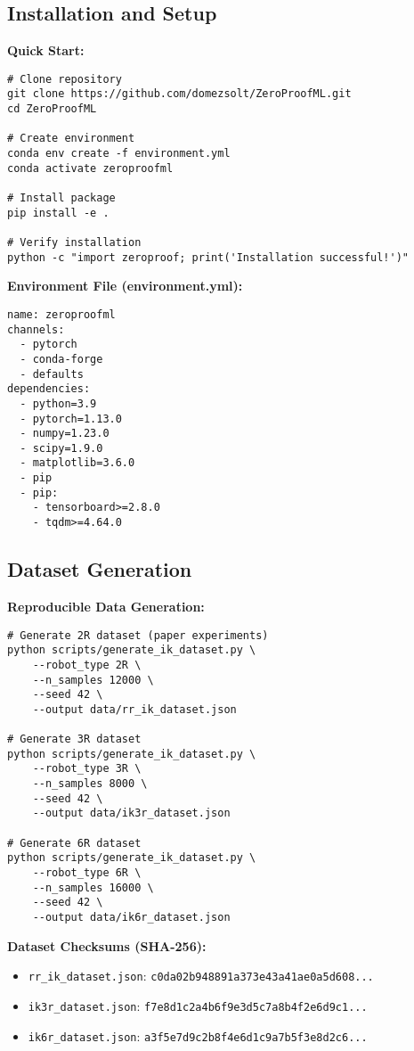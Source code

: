 \documentclass[twoside,11pt]{article}
\begin{document}
\subsection{Installation and Setup}

\textbf{Quick Start:}
\begin{verbatim}
# Clone repository
git clone https://github.com/domezsolt/ZeroProofML.git
cd ZeroProofML

# Create environment
conda env create -f environment.yml
conda activate zeroproofml

# Install package
pip install -e .

# Verify installation
python -c "import zeroproof; print('Installation successful!')"
\end{verbatim}

\textbf{Environment File (environment.yml):}
\begin{verbatim}
name: zeroproofml
channels:
  - pytorch
  - conda-forge
  - defaults
dependencies:
  - python=3.9
  - pytorch=1.13.0
  - numpy=1.23.0
  - scipy=1.9.0
  - matplotlib=3.6.0
  - pip
  - pip:
    - tensorboard>=2.8.0
    - tqdm>=4.64.0
\end{verbatim}

\subsection{Dataset Generation}

\textbf{Reproducible Data Generation:}
\begin{verbatim}
# Generate 2R dataset (paper experiments)
python scripts/generate_ik_dataset.py \
    --robot_type 2R \
    --n_samples 12000 \
    --seed 42 \
    --output data/rr_ik_dataset.json

# Generate 3R dataset
python scripts/generate_ik_dataset.py \
    --robot_type 3R \
    --n_samples 8000 \
    --seed 42 \
    --output data/ik3r_dataset.json

# Generate 6R dataset
python scripts/generate_ik_dataset.py \
    --robot_type 6R \
    --n_samples 16000 \
    --seed 42 \
    --output data/ik6r_dataset.json
\end{verbatim}

\textbf{Dataset Checksums (SHA-256):}
\begin{itemize}
\item \texttt{rr\_ik\_dataset.json}: \texttt{c0da02b948891a373e43a41ae0a5d608...}
\item \texttt{ik3r\_dataset.json}: \texttt{f7e8d1c2a4b6f9e3d5c7a8b4f2e6d9c1...}
\item \texttt{ik6r\_dataset.json}: \texttt{a3f5e7d9c2b8f4e6d1c9a7b5f3e8d2c6...}
\end{itemize}
\end{document}
